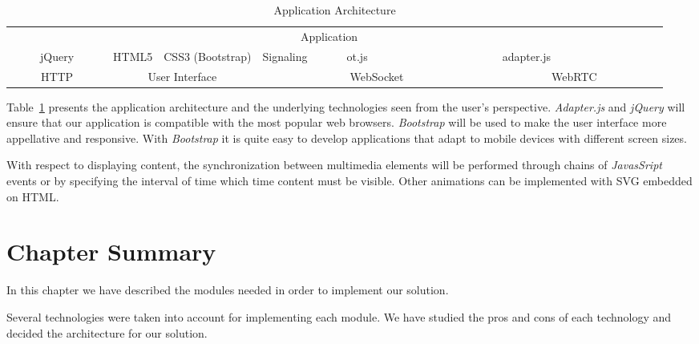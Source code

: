 \begin{table}[H]
\centering
	\caption{Application Architecture}
	\label{table:apparch}
    \begin{tabular}{ccccccccc@{}m{0pt}@{}}
	\hline 
\multicolumn{9}{|c|}{\cellcolor{Gray}Application}  &\\[12pt]\cline{1-6}\cline{8-8}
\multicolumn{2}{|c|}{~~~~~jQuery~~~~~} & \multicolumn{1}{c|}{HTML5} & \multicolumn{1}{c|}{CSS3 (Bootstrap)} & \multicolumn{1}{c|}{Signaling} & \multicolumn{1}{c|}{~~~~~ot.js~~~~~} & \multicolumn{1}{c|}{\cellcolor{Gray}~~~~~~~~~~~~~~~} & \multicolumn{1}{c|}{adapter.js} &   \multicolumn{1}{c|}{\cellcolor{Gray}~~~~~~~~~~~~~~~} &\\[12pt]\hline
\multicolumn{1}{|c|}{HTTP} & \multicolumn{3}{c|}{User Interface}  & \multicolumn{3}{c|}{WebSocket}    & \multicolumn{2}{c|}{WebRTC}      &\\[12pt]\hline
\end{tabular}
\end{table}


Table~\ref{table:apparch} presents the application architecture and the underlying technologies seen from the user's perspective. \emph{Adapter.js} and \emph{jQuery} will ensure that our application is compatible with the most popular web browsers.
\emph{Bootstrap} will be used to make the user interface more appellative and responsive. With \emph{Bootstrap} it is quite easy to develop applications that adapt to mobile devices with different screen sizes.

With respect to displaying content, the synchronization between multimedia elements will be performed through chains of \emph{JavasSript} events or by specifying the interval of time which time content must be visible. Other animations can be implemented with \ac{SVG} embedded on \ac{HTML}.

\section{Chapter Summary}
\label{architecture:summary}

In this chapter we have described the modules needed in order to implement our solution.

Several technologies were taken into account for implementing each module. We have studied the pros and cons of each technology and decided the architecture for our solution.


